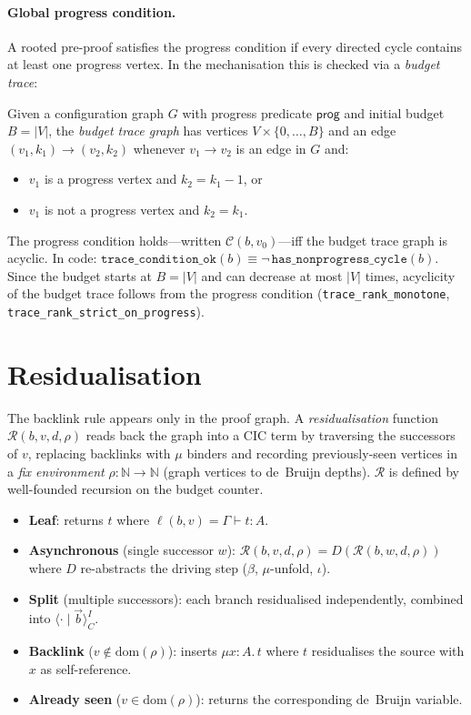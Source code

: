 \documentclass[runningheads]{llncs}
\newcommand{\tconf}[3]{#1 \vdash #2 : #3}
\begin{document}
\paragraph{Global progress condition.}
A rooted pre-proof satisfies the progress condition if every directed
cycle contains at least one progress vertex.
In the mechanisation this is checked via a \emph{budget trace}:

\begin{definition}
Given a configuration graph $G$ with progress predicate $\mathsf{prog}$
and initial budget $B = |V|$, the \emph{budget trace graph} has vertices
$V\times\{0,\dots,B\}$ and an edge $(v_1,k_1)\to(v_2,k_2)$ whenever
$v_1\to v_2$ is an edge in $G$ and:
\begin{itemize}
\item $v_1$ is a progress vertex and $k_2 = k_1 - 1$, or
\item $v_1$ is not a progress vertex and $k_2 = k_1$.
\end{itemize}
\end{definition}

\noindent The progress condition holds---written $\mathcal{C}(b,v_0)$---iff
the budget trace graph is acyclic.  In code:
$\texttt{trace\_condition\_ok}(b) \equiv
 \neg\,\texttt{has\_nonprogress\_cycle}(b)$.
Since the budget starts at $B=|V|$ and can decrease at most $|V|$ times,
acyclicity of the budget trace follows from the progress condition
(\texttt{trace\_rank\_monotone}, \texttt{trace\_rank\_strict\_on\_progress}).

\section{Residualisation}
\label{sec:residualise}

The backlink rule appears only in the proof graph.  A \emph{residualisation}
function $\mathcal{R}(b,v,d,\rho)$ reads back the graph into a CIC term by
traversing the successors of $v$, replacing backlinks with $\mu$ binders
and recording previously-seen vertices in a \emph{fix environment}
$\rho : \mathbb{N} \to \mathbb{N}$ (graph vertices to de~Bruijn depths).
$\mathcal{R}$ is defined by well-founded recursion on the budget counter.

\begin{itemize}
\item \textbf{Leaf}: returns $t$ where $\ell(b,v) = \tconf{\Gamma}{t}{A}$.
\item \textbf{Asynchronous} (single successor $w$):
  $\mathcal{R}(b,v,d,\rho) = D(\mathcal{R}(b,w,d,\rho))$ where $D$
  re-abstracts the driving step ($\beta$, $\mu$-unfold, $\iota$).
\item \textbf{Split} (multiple successors): each branch residualised
  independently, combined into $\langle \cdot \mid \vec{b} \rangle^I_C$.
\item \textbf{Backlink} ($v \notin \mathrm{dom}(\rho)$): inserts
  $\mu x{:}A.\,t$ where $t$ residualises the source with $x$ as
  self-reference.
\item \textbf{Already seen} ($v \in \mathrm{dom}(\rho)$): returns the
  corresponding de~Bruijn variable.
\end{itemize}
\end{document}
